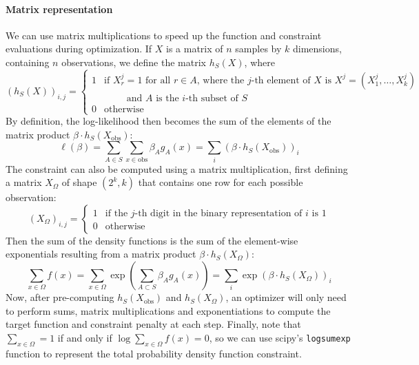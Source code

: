 \paragraph{Matrix representation}\label{matrix-representation}
We can use matrix multiplications to speed up the function and
constraint evaluations during optimization. If \(X\) is a matrix of
\(n\) samples by \(k\) dimensions, containing \(n\) observations, we
define the matrix \(h_S(X)\), where
\[
(h_S(X))_{i, j} = 
\begin{cases}
1 & \text{if } X_{r}^{j} = 1 \text{ for all } r \in A \text{, where the } j \text{-th element of } X \text{ is } X^{j} = (X^{j}_{1}, \dots, X^{j}_{k})
\\
& \qquad \text{ and } A \text{ is the } i \text{-th subset of } S 
\\
0 & \text{otherwise}
\end{cases}
\]
By definition, the log-likelihood then becomes the sum of the elements
of the matrix product \(\beta \cdot h_S(X_\text{obs})\):
\[
\ell(\beta) = \sum_{A \in S} \sum_{x \in \text{obs}} \beta_A g_A(x) = \sum_{i} \left( \beta \cdot h_S(X_\text{obs}) \right)_{i}
\]
The constraint can also be computed using a matrix multiplication, first
defining a matrix \(X_\Omega\) of shape \((2^{k}, k)\) that contains one
row for each possible observation:
\[
(X_\Omega)_{i, j} = \begin{cases}
1 & \text{if the } j \text{-th digit in the binary representation of } i \text{ is } 1 \\
0 & \text{otherwise}
\end{cases}
\]
Then the sum of the density functions is the sum of the element-wise
exponentials resulting from a matrix product
\(\beta \cdot h_S(X_\Omega)\):
\[
\sum_{x \in \Omega} f(x) = \sum_{x \in \Omega} \exp \left(\sum_{A \subset S} \beta_A g_A(x) \right) 
= \sum_{i} \exp \left( \beta \cdot h_S(X_\Omega) \right)_{i}
\]
Now, after pre-computing \(h_S(X_\text{obs})\) and \(h_S(X_\Omega)\), an
optimizer will only need to perform sums, matrix multiplications and
exponentiations to compute the target function and constraint penalty at
each step.
Finally, note that \(\sum_{x \in \Omega} = 1\) if and only if
\(\log \sum_{x \in \Omega} f(x) = 0\), so we can use scipy's
\texttt{logsumexp} function to represent the total probability density
function constraint.
